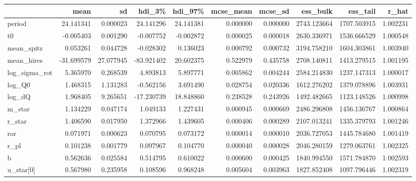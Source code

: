 \begin{tabular}{lrrrrrrrrr}
\toprule
{} &        mean &         sd &      hdi\_3\% &     hdi\_97\% &  mcse\_mean &   mcse\_sd &     ess\_bulk &     ess\_tail &     r\_hat \\
\midrule
period        &   24.141341 &   0.000023 &   24.141296 &   24.141381 &   0.000000 &  0.000000 &  2743.123664 &  1707.503915 &  1.002231 \\
t0            &   -0.005403 &   0.001290 &   -0.007752 &   -0.002872 &   0.000025 &  0.000018 &  2630.336971 &  1536.666529 &  1.000548 \\
mean\_spitz    &    0.053261 &   0.044728 &   -0.028302 &    0.136023 &   0.000792 &  0.000732 &  3194.758210 &  1604.303861 &  1.003940 \\
mean\_hires    &  -31.699579 &  27.077945 &  -83.921402 &   20.602375 &   0.522979 &  0.435758 &  2708.140811 &  1413.279515 &  1.001195 \\
log\_sigma\_rot &    5.365970 &   0.268539 &    4.893813 &    5.897771 &   0.005862 &  0.004244 &  2584.214830 &  1237.147313 &  1.000017 \\
log\_Q0        &    1.468315 &   1.131283 &   -0.562156 &    3.691490 &   0.028754 &  0.020336 &  1612.276202 &  1379.078896 &  1.003931 \\
log\_dQ        &    1.968405 &   9.265651 &  -17.230739 &   18.848860 &   0.238528 &  0.243926 &  1492.482665 &  1123.148526 &  1.000998 \\
m\_star        &    1.134229 &   0.047174 &    1.049133 &    1.227431 &   0.000945 &  0.000669 &  2486.296808 &  1456.136767 &  1.000864 \\
r\_star        &    1.406590 &   0.017950 &    1.372966 &    1.439605 &   0.000406 &  0.000289 &  2107.013241 &  1335.379793 &  1.001246 \\
ror           &    0.071971 &   0.000623 &    0.070795 &    0.073172 &   0.000014 &  0.000010 &  2036.727053 &  1445.784680 &  1.001419 \\
r\_pl          &    0.101238 &   0.001779 &    0.097967 &    0.104770 &   0.000040 &  0.000028 &  2046.280159 &  1279.063761 &  1.002325 \\
b             &    0.562636 &   0.025584 &    0.514795 &    0.610022 &   0.000600 &  0.000425 &  1840.994550 &  1571.784870 &  1.002593 \\
u\_star[0]     &    0.567980 &   0.235958 &    0.108596 &    0.968248 &   0.005604 &  0.003963 &  1827.852408 &  1097.796446 &  1.002319 \\

\end{tabular}
